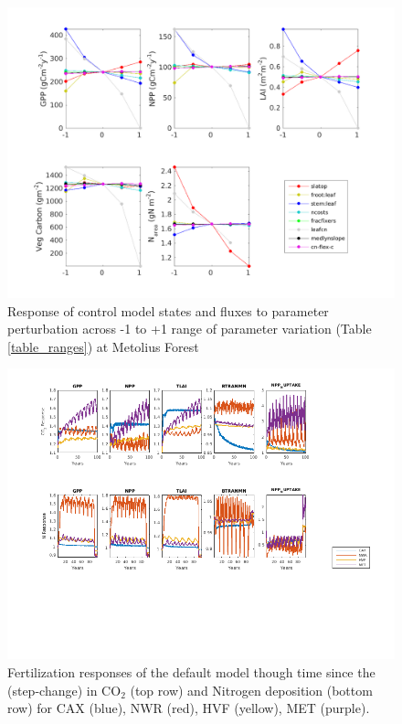 \usepackage{}\documentclass[draft,linenumbers]{agujournal}
\begin{document}
 \begin{figure}[h]
     \includegraphics[width=1.2\textwidth]{matlab/figures/MAY19jp_STATE_-r200_MET_y2000.png}
     \caption{Response of control model states and fluxes to parameter perturbation across -1 to +1 range of parameter variation (Table \ref{table_ranges}) at Metolius Forest}
     \label{MET state}
 \end{figure}

  \begin{figure}[h]
     \includegraphics[width=1.2\textwidth]{matlab/figures/MAY19jp_CNtime_defpft.png}
     \caption{Fertilization responses of the default model though time since the (step-change) in CO$_{2}$ (top row) and Nitrogen deposition (bottom row) for CAX (blue), NWR (red), HVF (yellow), MET (purple).}
     \label{MET state}
 \end{figure}
     
\end{document}
